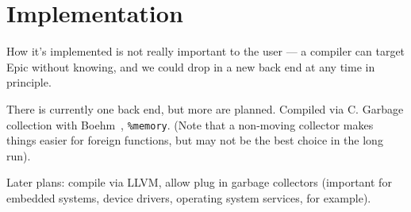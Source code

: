 \section{Implementation}

How it's implemented is not really important to the user --- a
compiler can target Epic without knowing, and we could drop in a new
back end at any time in principle.

There is currently one back end, but more are planned. Compiled via
C. Garbage collection with Boehm~\cite{boehm-gc},
\texttt{\%memory}. (Note that a non-moving collector makes things
easier for foreign functions, but may not be the best choice in the
long run).

Later plans: compile via LLVM, allow plug in garbage collectors
(important for embedded systems, device drivers, operating system
services, for example).

